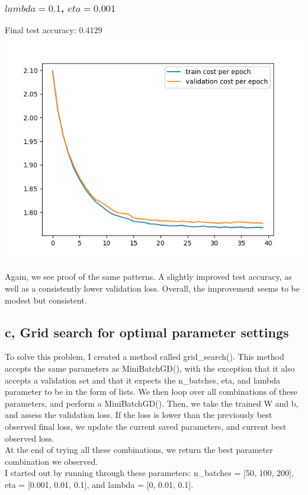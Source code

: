 \documentclass[11pt,a4paper]{article}
\begin{document}
\subsubsection{$lambda=0.1$, $eta=0.001$}
Final test accuracy: 0.4129\\
\includegraphics[width=\textwidth]{eta_0.001_lambda_0.1_augmentation.png}

Again, we see proof of the same patterns. A slightly improved test accuracy, as well as a consistently lower validation loss. Overall, the improvement seems to be modest but consistent.

\subsection{c, Grid search for optimal parameter settings}
To solve this problem, I created a method called grid\_search(). This method accepts the same parameters as MiniBatchGD(), with the exception that it also accepts a validation set and that it expects the n\_batches, eta, and lambda parameter to be in the form of lists. We then loop over all combinations of these parameters, and perform a MiniBatchGD(). Then, we take the trained W and b, and assess the validation loss. If the loss is lower than the previously best observed final loss, we update the current saved parameters, and current best observed loss.\\

At the end of trying all these combinations, we return the best parameter combination we observed.\\

I started out by running through these parameters: n\_batches = [50, 100, 200], eta = [0.001, 0.01, 0.1], and lambda = [0, 0.01, 0.1].\\
\end{document}
